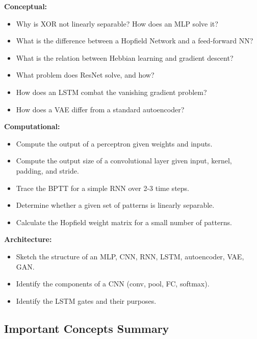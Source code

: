 \documentclass[11pt,a4paper]{article}
\begin{document}
\textbf{Conceptual:}
\begin{itemize}[leftmargin=*]
    \item Why is XOR not linearly separable? How does an MLP solve it?
    \item What is the difference between a Hopfield Network and a feed-forward NN?
    \item What is the relation between Hebbian learning and gradient descent?
    \item What problem does ResNet solve, and how?
    \item How does an LSTM combat the vanishing gradient problem?
    \item How does a VAE differ from a standard autoencoder?
\end{itemize}

\textbf{Computational:}
\begin{itemize}[leftmargin=*]
    \item Compute the output of a perceptron given weights and inputs.
    \item Compute the output size of a convolutional layer given input, kernel, padding, and stride.
    \item Trace the BPTT for a simple RNN over 2-3 time steps.
    \item Determine whether a given set of patterns is linearly separable.
    \item Calculate the Hopfield weight matrix for a small number of patterns.
\end{itemize}

\textbf{Architecture:}
\begin{itemize}[leftmargin=*]
    \item Sketch the structure of an MLP, CNN, RNN, LSTM, autoencoder, VAE, GAN.
    \item Identify the components of a CNN (conv, pool, FC, softmax).
    \item Identify the LSTM gates and their purposes.
\end{itemize}

\subsection{Important Concepts Summary}
\end{document}
